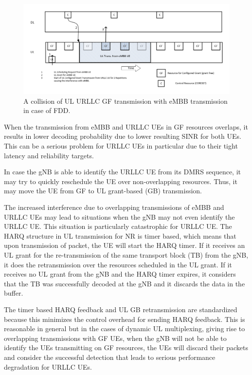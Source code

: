 \documentclass[conference]{IEEEtran}
\begin{document}
\begin{figure}[htbp]
\centerline{\includegraphics[scale=0.22]{fig1.png}}
\caption{A collision of UL URLLC GF transmission with eMBB transmission in case of FDD.}
\label{fig1}
\end{figure}

When the transmission from eMBB and URLLC UEs in GF resources overlaps, it results in lower decoding probability due to lower resulting SINR for both UEs. This can be a serious problem for URLLC UEs in particular due to their tight latency and reliability targets.

In case the gNB is able to identify the URLLC UE from its DMRS sequence, it may try to quickly reschedule the UE over non-overlapping resources. Thus, it may move the UE from GF to UL grant-based (GB) transmission.

The increased interference due to overlapping transmissions of eMBB and URLLC UEs may lead to situations when the gNB may not even identify the URLLC UE. This situation is particularly catastrophic for URLLC UE. The HARQ structure in UL transmission for NR is timer based, which means that upon transmission of packet, the UE will start the HARQ timer. If it receives an UL grant for the re-transmission of the same transport block (TB) from the gNB, it does the retransmission over the resources scheduled in the UL grant. If it receives no UL grant from the gNB and the HARQ timer expires, it considers that the TB was successfully decoded at the gNB and it discards the data in the buffer. 

The timer based HARQ feedback and UL GB retransmission are standardized because this minimizes the control overhead for sending HARQ feedback. This is reasonable in general but in the cases of dynamic UL multiplexing, giving rise to overlapping transmissions with GF UEs, when the gNB will not be able to identify the UEs transmitting on GF resources, the UEs will discard their packets and consider the successful detection that leads to serious performance degradation for URLLC UEs.
\end{document}
